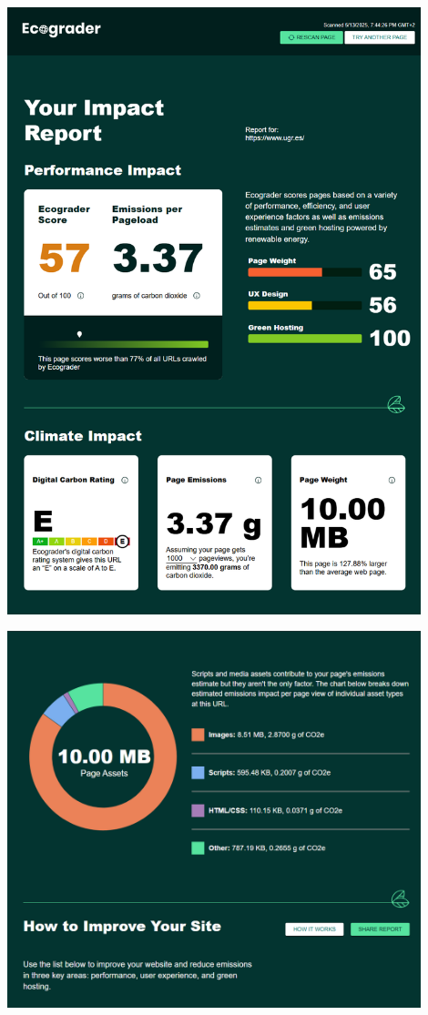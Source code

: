 \documentclass[12pt,a4paper]{report}
\begin{document}
\begin{center}
  \includegraphics[width=0.9\textwidth]{imagenes/Ecograder_2.png}
\end{center}

\begin{center}
  \includegraphics[width=0.9\textwidth]{imagenes/Ecograder_3.png}
\end{center}
\end{document}
